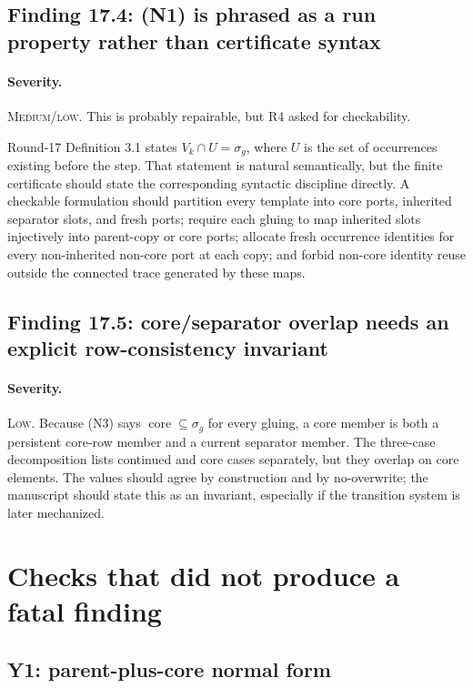 \documentclass[11pt]{article}
\newcommand{\core}{\operatorname{core}}
\newcommand{\sev}[1]{\textsc{#1}}
\begin{document}
\subsection{Finding 17.4: (N1) is phrased as a run property rather than certificate syntax}

\paragraph{Severity.} \sev{Medium/low}.  This is probably repairable, but R4 asked for checkability.

Round-17 Definition 3.1 states $V_k\cap U=\sigma_g$, where $U$ is the set of occurrences existing before the step.  That statement is natural semantically, but the finite certificate should state the corresponding syntactic discipline directly.  A checkable formulation should partition every template into core ports, inherited separator slots, and fresh ports; require each gluing to map inherited slots injectively into parent-copy or core ports; allocate fresh occurrence identities for every non-inherited non-core port at each copy; and forbid non-core identity reuse outside the connected trace generated by these maps.

\subsection{Finding 17.5: core/separator overlap needs an explicit row-consistency invariant}

\paragraph{Severity.} \sev{Low}.  Because (N3) says $\core\subseteq\sigma_g$ for every gluing, a core member is both a persistent core-row member and a current separator member.  The three-case decomposition lists continued and core cases separately, but they overlap on core elements.  The values should agree by construction and by no-overwrite; the manuscript should state this as an invariant, especially if the transition system is later mechanized.

\section{Checks that did not produce a fatal finding}

\subsection{Y1: parent-plus-core normal form}
\end{document}
